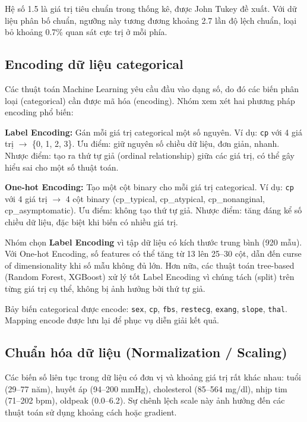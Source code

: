 Hệ số 1.5 là giá trị tiêu chuẩn trong thống kê, được John Tukey đề xuất. Với dữ liệu phân bố chuẩn, ngưỡng này tương đương khoảng 2.7 lần độ lệch chuẩn, loại bỏ khoảng 0.7\% quan sát cực trị ở mỗi phía.

\subsection{Encoding dữ liệu categorical}

Các thuật toán Machine Learning yêu cầu đầu vào dạng số, do đó các biến phân loại (categorical) cần được mã hóa (encoding). Nhóm xem xét hai phương pháp encoding phổ biến:

\textbf{Label Encoding:} Gán mỗi giá trị categorical một số nguyên. Ví dụ: \texttt{cp} với 4 giá trị $\rightarrow$ \{0, 1, 2, 3\}. Ưu điểm: giữ nguyên số chiều dữ liệu, đơn giản, nhanh. Nhược điểm: tạo ra thứ tự giả (ordinal relationship) giữa các giá trị, có thể gây hiểu sai cho một số thuật toán.

\textbf{One-hot Encoding:} Tạo một cột binary cho mỗi giá trị categorical. Ví dụ: \texttt{cp} với 4 giá trị $\rightarrow$ 4 cột binary (cp\_typical, cp\_atypical, cp\_nonanginal, cp\_asymptomatic). Ưu điểm: không tạo thứ tự giả. Nhược điểm: tăng đáng kể số chiều dữ liệu, đặc biệt khi biến có nhiều giá trị.

Nhóm chọn \textbf{Label Encoding} vì tập dữ liệu có kích thước trung bình (920 mẫu). Với One-hot Encoding, số features có thể tăng từ 13 lên 25--30 cột, dẫn đến curse of dimensionality khi số mẫu không đủ lớn. Hơn nữa, các thuật toán tree-based (Random Forest, XGBoost) xử lý tốt Label Encoding vì chúng tách (split) trên từng giá trị cụ thể, không bị ảnh hưởng bởi thứ tự giả.

Bảy biến categorical được encode: \texttt{sex}, \texttt{cp}, \texttt{fbs}, \texttt{restecg}, \texttt{exang}, \texttt{slope}, \texttt{thal}. Mapping encode được lưu lại để phục vụ diễn giải kết quả.

\subsection{Chuẩn hóa dữ liệu (Normalization / Scaling)}

Các biến số liên tục trong dữ liệu có đơn vị và khoảng giá trị rất khác nhau: tuổi (29--77 năm), huyết áp (94--200 mmHg), cholesterol (85--564 mg/dl), nhịp tim (71--202 bpm), oldpeak (0.0--6.2). Sự chênh lệch scale này ảnh hưởng đến các thuật toán sử dụng khoảng cách hoặc gradient.

